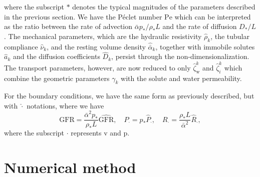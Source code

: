 \documentclass{article}
\begin{document}
    where the subscript $*$ denotes the typical magnitudes of the parameters described in the previous section.
We have the P\'eclet number $\mathrm{Pe}$ which can be interpreted as the ratio between the rate of advection $\bar{\alpha}p_*/\rho_*L$ and the rate of diffusion $D_*/L$.
The mechanical parameters, which are the hydraulic resistivity $\hat{\rho}_k$, the tubular compliance $\hat{\nu}_k$, and the resting volume density $\hat{\bar{\alpha}}_k$, together with immobile solutes $\hat{a}_k$ and the diffusion coefficients $\hat{D}_k$, persist through the non-dimensionalization.
The transport parameters, however, are now reduced to only $\hat{\zeta}_\mathrm{w}^k$ and $\hat{\zeta}_i^k$ which combine the geometric parameters $\gamma_k$ with the solute and water permeability.

For the boundary conditions, we have the same form as previously described, but with $\hat{\cdot}$ notations, where we have
\begin{equation}
    \mathrm{GFR} = \frac{\bar{\alpha}^2 p_*}{\rho_* L}\widehat{\mathrm{GFR}},\quad
    P_\cdot = p_*\hat{P}_\cdot,\quad R_\cdot = \frac{\rho_* L}{\bar{\alpha}^2}\hat{R}_\cdot,
\end{equation}
    where the subscript $\cdot$ represents $\mathrm{v}$ and $\mathrm{p}$.

\section{Numerical method}
\end{document}
